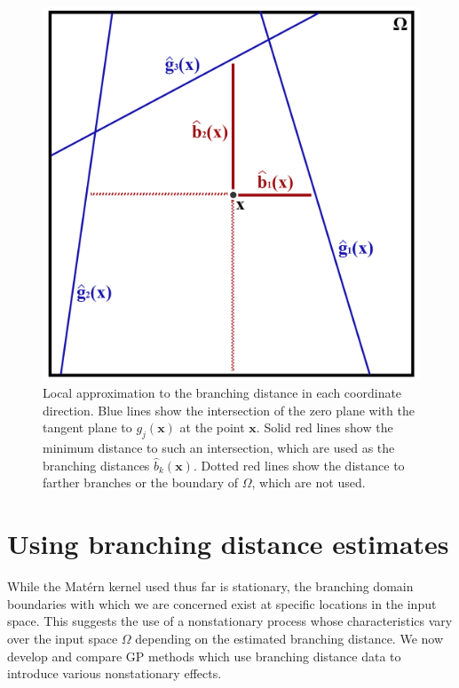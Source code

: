 \documentclass{article}
\renewcommand{\vec}[1]{\mathbf{#1}}
\numberwithin{equation}{section}
\begin{document}
\begin{figure}
		\centering
		\captionsetup{justification=centering}
		\includegraphics[scale=0.7]{figures/branch-approx.png}
		\caption{Local approximation to the branching distance in each coordinate direction. Blue lines show the intersection of the zero plane with the tangent plane to $g_j(\vec{x})$ at the point $\vec{x}$. Solid red lines show the minimum distance to such an intersection, which are used as the branching distances $\hat{b}_k(\vec{x})$. Dotted red lines show the distance to farther branches or the boundary of $\Omega$, which are not used.}
		\label{branch}
\end{figure}

\section{Using branching distance estimates} \label{using_branch}
While the Mat\'ern kernel used thus far is stationary, the branching domain boundaries with which we are concerned exist at specific locations in the input space. This suggests the use of a nonstationary process whose characteristics vary over the input space $\Omega$ depending on the estimated branching distance. We now develop and compare GP methods which use branching distance data to introduce various nonstationary effects.
\end{document}
